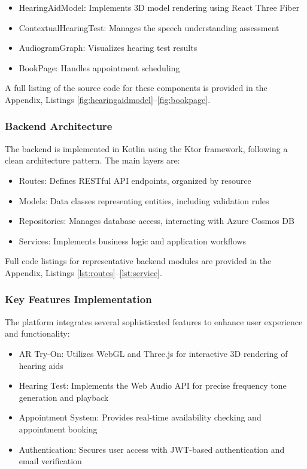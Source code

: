 \documentclass{article}
\begin{document}
\begin{itemize} 
    \item HearingAidModel: Implements 3D model rendering using React Three Fiber 
    \item ContextualHearingTest: Manages the speech understanding assessment 
    \item AudiogramGraph: Visualizes hearing test results 
    \item BookPage: Handles appointment scheduling 
\end{itemize}

A full listing of the source code for these components is provided in the Appendix, Listings \ref{fig:hearingaidmodel}--\ref{fig:bookpage}.

\subsubsection{Backend Architecture}
The backend is implemented in Kotlin using the Ktor framework, following a clean architecture pattern. The main layers are:

\begin{itemize} 
    \item Routes: Defines RESTful API endpoints, organized by resource \item Models: Data classes representing entities, including validation rules 
    \item Repositories: Manages database access, interacting with Azure Cosmos DB 
    \item Services: Implements business logic and application workflows \end{itemize}

Full code listings for representative backend modules are provided in the Appendix, Listings \ref{lst:routes}--\ref{lst:service}.

\subsubsection{Key Features Implementation}
The platform integrates several sophisticated features to enhance user experience and functionality:

\begin{itemize} 
    \item AR Try-On: Utilizes WebGL and Three.js for interactive 3D rendering of hearing aids 
    \item Hearing Test: Implements the Web Audio API for precise frequency tone generation and playback 
    \item Appointment System: Provides real-time availability checking and appointment booking 
    \item Authentication: Secures user access with JWT-based authentication and email verification 
\end{itemize}
\end{document}
